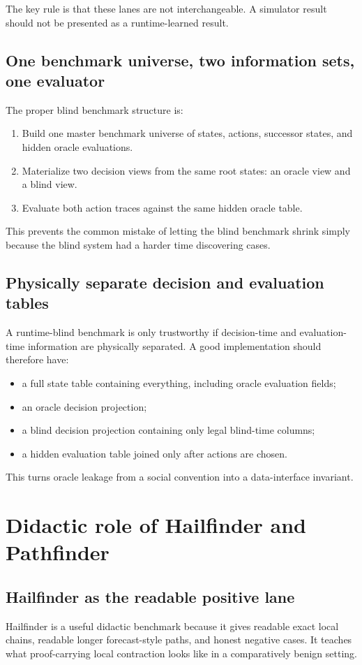 \documentclass[11pt]{article}
\begin{document}
The key rule is that these lanes are not interchangeable. A simulator result should not be presented as a runtime-learned result.

\subsection{One benchmark universe, two information sets, one evaluator}
The proper blind benchmark structure is:
\begin{enumerate}[label=\arabic*.]
    \item Build one master benchmark universe of states, actions, successor states, and hidden oracle evaluations.
    \item Materialize two decision views from the same root states: an oracle view and a blind view.
    \item Evaluate both action traces against the same hidden oracle table.
\end{enumerate}

This prevents the common mistake of letting the blind benchmark shrink simply because the blind system had a harder time discovering cases.

\subsection{Physically separate decision and evaluation tables}
A runtime-blind benchmark is only trustworthy if decision-time and evaluation-time information are physically separated. A good implementation should therefore have:
\begin{itemize}
    \item a full state table containing everything, including oracle evaluation fields;
    \item an oracle decision projection;
    \item a blind decision projection containing only legal blind-time columns;
    \item a hidden evaluation table joined only after actions are chosen.
\end{itemize}

This turns oracle leakage from a social convention into a data-interface invariant.

\section{Didactic role of Hailfinder and Pathfinder}
\subsection{Hailfinder as the readable positive lane}
Hailfinder is a useful didactic benchmark because it gives readable exact local chains, readable longer forecast-style paths, and honest negative cases. It teaches what proof-carrying local contraction looks like in a comparatively benign setting.
\end{document}
